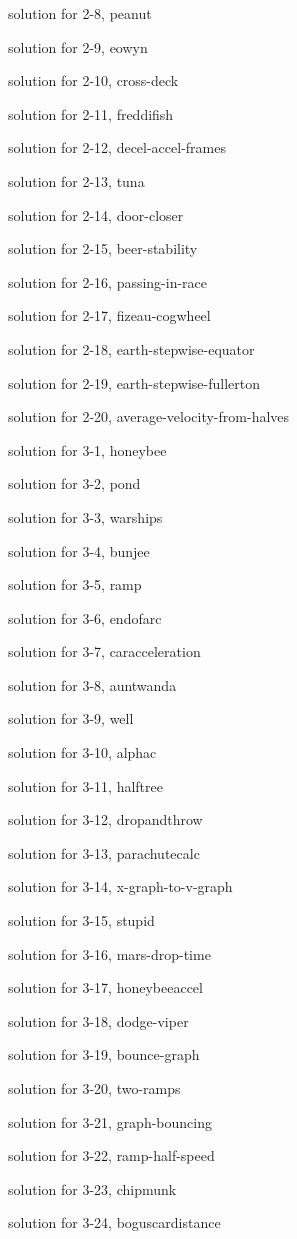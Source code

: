 \documentclass{problems}
\begin{document}
solution for 2-8, peanut

solution for 2-9, eowyn

solution for 2-10, cross-deck

solution for 2-11, freddifish

solution for 2-12, decel-accel-frames

solution for 2-13, tuna

solution for 2-14, door-closer

solution for 2-15, beer-stability

solution for 2-16, passing-in-race

solution for 2-17, fizeau-cogwheel

solution for 2-18, earth-stepwise-equator

solution for 2-19, earth-stepwise-fullerton

solution for 2-20, average-velocity-from-halves

solution for 3-1, honeybee

solution for 3-2, pond

solution for 3-3, warships

solution for 3-4, bunjee

solution for 3-5, ramp

solution for 3-6, endofarc

solution for 3-7, caracceleration

solution for 3-8, auntwanda

solution for 3-9, well

solution for 3-10, alphac

solution for 3-11, halftree

solution for 3-12, dropandthrow

solution for 3-13, parachutecalc

solution for 3-14, x-graph-to-v-graph

solution for 3-15, stupid

solution for 3-16, mars-drop-time

solution for 3-17, honeybeeaccel

solution for 3-18, dodge-viper

solution for 3-19, bounce-graph

solution for 3-20, two-ramps

solution for 3-21, graph-bouncing

solution for 3-22, ramp-half-speed

solution for 3-23, chipmunk

solution for 3-24, boguscardistance
\end{document}
